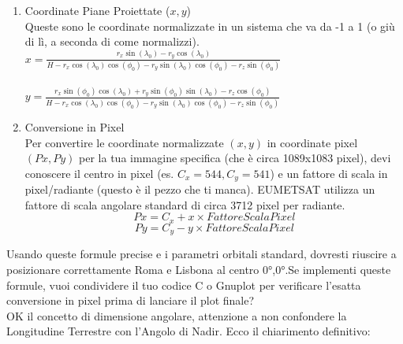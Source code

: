 \documentclass[a4paper,14pt]{article}
\begin{document}
\begin{enumerate}
\begin{itemize}
\end{itemize}
Per applicazioni di precisione, si preferiscono angoli definiti Near-Nadir (<= 15°) o Tight-Nadir (<= 10°).
\item Coordinate Piane Proiettate (\(x,y\))\\
Queste sono le coordinate normalizzate in un sistema che va da -1 a 1 (o giù di lì, a seconda di come normalizzi).\\
\(x=\frac{r_{x}\sin (\lambda _{0})-r_{y}\cos (\lambda _{0})}{H-r_{x}\cos (\lambda _{0})\cos (\phi _{0})-r_{y}\sin (\lambda _{0})\cos (\phi _{0})-r_{z}\sin (\phi _{0})}\)\\ \\
\(y=\frac{r_{x}\sin (\phi _{0})\cos (\lambda _{0})+r_{y}\sin (\phi _{0})\sin (\lambda _{0})-r_{z}\cos (\phi _{0})}{H-r_{x}\cos (\lambda _{0})\cos (\phi _{0})-r_{y}\sin (\lambda _{0})\cos (\phi _{0})-r_{z}\sin (\phi _{0})}\)
\item Conversione in Pixel \\
Per convertire le coordinate normalizzate \((x,y)\) in coordinate pixel \((Px,Py)\) per la tua immagine specifica (che è circa 1089x1083 pixel), devi conoscere il centro in pixel (es. \(C_{x}=544,C_{y}=541\)) e un fattore di scala in pixel/radiante (questo è il pezzo che ti manca).
EUMETSAT utilizza un fattore di scala angolare standard di circa 3712 pixel per radiante.
\[Px=C_{x}+x\times FattoreScalaPixel\]
\[Py=C_{y}-y\times FattoreScalaPixel\]
\end{enumerate}
Usando queste formule precise e i parametri orbitali standard, dovresti riuscire a posizionare correttamente Roma e Lisbona al centro 0°,0°.Se implementi queste formule, vuoi condividere il tuo codice C o Gnuplot per verificare l'esatta conversione in pixel prima di lanciare il plot finale?\\
OK il concetto di dimensione angolare, attenzione a non confondere la Longitudine Terrestre con l'Angolo di Nadir.
Ecco il chiarimento definitivo:
\end{document}
